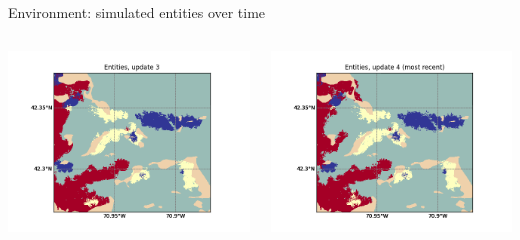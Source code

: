 \documentclass[9pt,xcolor=table]{beamer}
\begin{document}
\begin{frame}{Environment: simulated entities over time}
\begin{columns}
\begin{column}{0.5\textwidth}
            \includegraphics[width=\textwidth,trim={0cm 0cm 0cm 0cm},clip]{img/e3.png}
        \end{column}
        \begin{column}{0.5\textwidth}
            \includegraphics[width=\textwidth,trim={0cm 0cm 0cm 0cm},clip]{img/e4.png}
        \end{column}
    \end{columns}
\end{frame}
\end{document}
